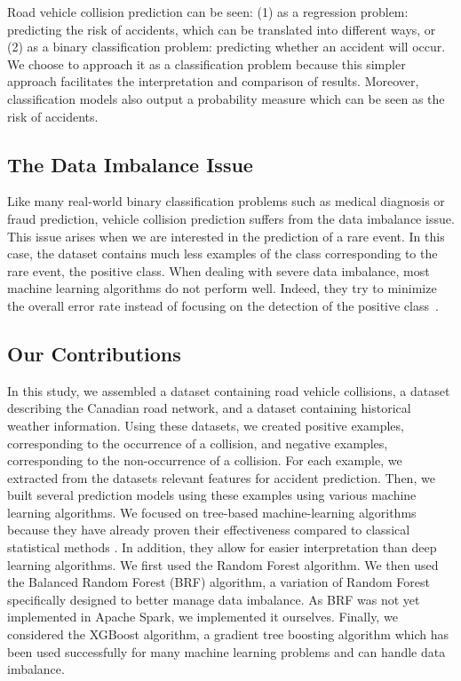\documentclass[conference]{IEEEtran}
\begin{document}
Road vehicle collision prediction can be seen: (1) as a regression problem: predicting the risk of accidents, which can be translated into different ways, or (2) as a binary classification problem: predicting whether an accident will occur. 
We choose to approach it as a classification problem because this simpler approach facilitates the interpretation and comparison of results.
Moreover, classification models also output a probability measure which can be seen as the risk of accidents.


\subsection{The Data Imbalance Issue}

Like many real-world binary classification problems such as medical diagnosis or fraud prediction, vehicle collision prediction suffers from the data imbalance issue. This issue arises when we are interested in the prediction of a rare event. In this case, the dataset contains much less examples of the class corresponding to the rare event, the positive class. When dealing with severe data imbalance, most machine learning algorithms do not perform well. Indeed, they try to minimize the overall error rate instead of focusing on the detection of the positive class~\cite{Chen2004}.


\subsection{Our Contributions}

In this study, we assembled a dataset containing road vehicle collisions, a dataset describing the Canadian road network, and a dataset containing historical weather information. Using these datasets, we created positive examples, corresponding to the occurrence of a collision, and negative examples, corresponding to the non-occurrence of a collision. For each example, we extracted from the datasets relevant features for accident prediction. Then, we built several prediction models using these examples using various machine learning algorithms. 
We focused on tree-based machine-learning algorithms because they have already proven their effectiveness compared to classical statistical methods \cite{Chang2005, Chang2005b}. In addition, they allow for easier interpretation than deep learning algorithms. We first used the Random Forest algorithm\cite{Breiman2001}. 
We then used the Balanced Random Forest (BRF) algorithm\cite{Chen2004}, a variation of Random Forest specifically designed to better manage data imbalance. 
As BRF was not yet implemented in Apache Spark, we implemented it ourselves. Finally, we considered the XGBoost algorithm\cite{TChen2016}, a gradient tree boosting algorithm which has been used successfully for many machine learning problems and can handle data imbalance\cite{xgboost_doc}.
\end{document}
